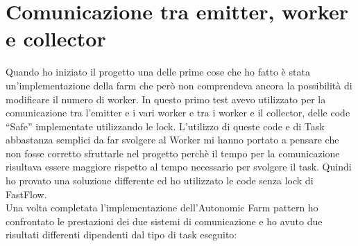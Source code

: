 \documentclass[12pt]{report}
\begin{document}
\section{Comunicazione tra emitter, worker e collector}

Quando ho iniziato il progetto una delle prime cose che ho fatto è stata un'implementazione della farm che però non comprendeva ancora la possibilità di modificare il numero di worker. 
In questo primo test avevo utilizzato per la comunicazione tra l'emitter e i vari worker e tra i worker e il collector, delle code ``Safe'' implementate utilizzando le lock.
L'utilizzo di queste code e di Task abbastanza semplici da far svolgere al Worker mi hanno portato a pensare che non fosse corretto sfruttarle nel progetto perchè il tempo per la comunicazione risultava essere maggiore rispetto al tempo necessario per svolgere il task.
Quindi ho provato una soluzione differente ed ho utilizzato le code senza lock di FastFlow.\\Una volta completata l'implementazione dell'Autonomic Farm pattern ho confrontato le prestazioni dei due sistemi di comunicazione e ho avuto due risultati differenti dipendenti dal tipo di task eseguito:
\end{document}
